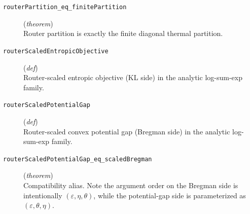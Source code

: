 \documentclass[11pt,a4paper]{article}
\begin{document}
\begin{description}
  \item[\texttt{routerPartition\_eq\_finitePartition}] (\textit{theorem}) \\ Router partition is exactly the finite diagonal thermal partition.
  \item[\texttt{routerScaledEntropicObjective}] (\textit{def}) \\ Router-scaled entropic objective (KL side) in the analytic log-sum-exp family.
  \item[\texttt{routerScaledPotentialGap}] (\textit{def}) \\ Router-scaled convex potential gap (Bregman side) in the analytic log-sum-exp family.
  \item[\texttt{routerScaledPotentialGap\_eq\_scaledBregman}] (\textit{theorem}) \\ Compatibility alias. 
Note the argument order on the Bregman side is intentionally $(\varepsilon , \eta , \theta )$, 
while the potential-gap side is parameterized as $(\varepsilon , \theta , \eta )$.
\end{description}
\end{document}
